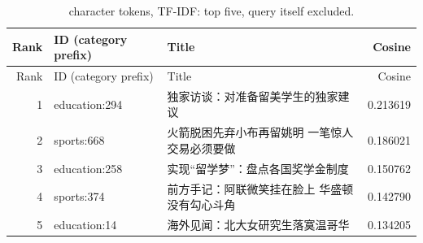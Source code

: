 {\small\renewcommand{\arraystretch}{1.05}
\begin{longtable}{rp{}p{}r}
\caption{character tokens, TF-IDF: top five, query itself excluded.}\\
\toprule
Rank & ID (category prefix) & Title & Cosine \\ \midrule\endfirsthead
\toprule
Rank & ID (category prefix) & Title & Cosine \\ \midrule\endhead
1 & education:294 & 独家访谈：对准备留美学生的独家建议 & 0.213619 \\
2 & sports:668 & 火箭脱困先弃小布再留姚明 一笔惊人交易必须要做 & 0.186021 \\
3 & education:258 & 实现“留学梦”：盘点各国奖学金制度 & 0.150762 \\
4 & sports:374 & 前方手记：阿联微笑挂在脸上 华盛顿没有勾心斗角 & 0.142790 \\
5 & education:14 & 海外见闻：北大女研究生落寞温哥华 & 0.134205 \\
\bottomrule
\end{longtable}
}

